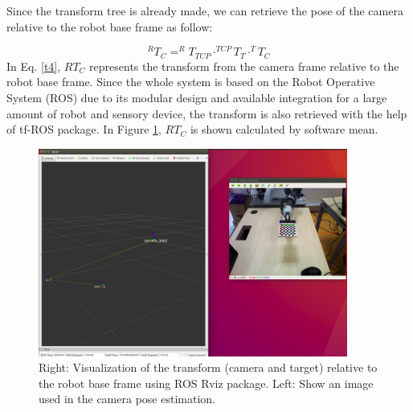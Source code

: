 Since the transform tree is already made, we can retrieve the pose of the camera relative to the robot base frame as follow:

\begin{equation}
^{R}T_{C}= ^{R}T_{TCP} \cdot ^{TCP}T_{T} \cdot ^{T}T_{C}\label{t4}
\end{equation}
In Eq. \ref{t4}, ${R}T_{C}$ represents the transform from the camera frame relative to the robot base frame. Since the whole system is based on the Robot Operative System (ROS) due to its modular design and available integration for a large amount of robot and sensory device, the transform is also retrieved with the help of tf-ROS package. In Figure \ref{fig:tf6}, ${R}T_{C}$ is shown calculated by software mean. 


\begin{figure}[!h]
\begin{center}
\includegraphics[width=4in]{figures03/rviz1.png}
\caption{Right: Visualization of the transform (camera and target) relative to the robot base frame using ROS Rviz package. Left: Show an image used in the camera pose estimation.}
\label{fig:tf6}
\end{center}
\end{figure}






























